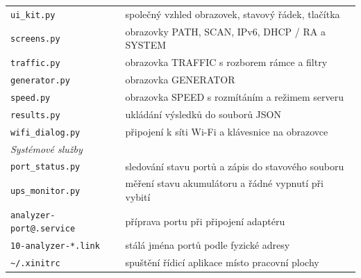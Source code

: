 \begin{table}[htbp]
\begin{tabular}{lp{9.5cm}}
        \texttt{ui\_kit.py} & společný vzhled obrazovek, stavový řádek, tlačítka \\
        \texttt{screens.py} & obrazovky PATH, SCAN, IPv6, DHCP / RA a SYSTEM \\
        \texttt{traffic.py} & obrazovka TRAFFIC s rozborem rámce a filtry \\
        \texttt{generator.py} & obrazovka GENERATOR \\
        \texttt{speed.py} & obrazovka SPEED s rozmítáním a režimem serveru \\
        \texttt{results.py} & ukládání výsledků do souborů JSON \\
        \texttt{wifi\_dialog.py} & připojení k síti Wi-Fi a klávesnice na obrazovce \\
        \multicolumn{2}{l}{\textit{Systémové služby}} \\
        \texttt{port\_status.py} & sledování stavu portů a zápis do stavového souboru \\
        \texttt{ups\_monitor.py} & měření stavu akumulátoru a řádné vypnutí při vybití \\
        \texttt{analyzer-port@.service} & příprava portu při připojení adaptéru \\
        \texttt{10-analyzer-*.link} & stálá jména portů podle fyzické adresy \\
        \texttt{\textasciitilde/.xinitrc} & spuštění řídicí aplikace místo pracovní plochy \\
        \hline
    \end{tabular}
\end{table}
